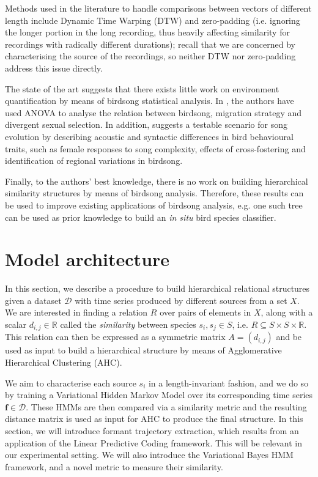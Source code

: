 \documentclass[pdftex,11pt,a4paper]{article}
\theoremstyle{definition}
\theoremstyle{remark}
\newcommand*{\V}[1]{\mathbf{#1}}%
\begin{document}
\par Methods used in the literature to handle comparisons between vectors of different length include Dynamic Time Warping (DTW) \cite{Jancovic2013,Muda2010} and zero-padding (i.e. ignoring the longer portion in the long recording, thus heavily affecting similarity for recordings with radically different durations); recall that we are concerned by characterising the source of the recordings, so neither DTW nor zero-padding address this issue directly. 
\par The state of the art suggests that there exists little work on environment quantification by means of birdsong statistical analysis. In \cite{Collins2009}, the authors have used ANOVA to analyse the relation between birdsong, migration strategy and divergent sexual selection. In addition, \cite{BolhuisJohanJ.andEveraertMartin2015} suggests a testable scenario for song evolution by describing acoustic and syntactic differences in bird behavioural traits, such as female responses to song complexity, effects of cross-fostering and identification of regional variations in birdsong.
\par Finally, to the authors' best knowledge, there is no work on building hierarchical similarity structures by means of birdsong analysis. Therefore, these results can be used to improve existing applications of birdsong analysis, e.g. one such tree can be used as prior knowledge to build an \emph{in situ} bird species classifier.

\section{Model architecture}
\label{section_model}
In this section, we describe a procedure to build hierarchical relational structures given a dataset $\mathcal{D}$ with time series produced by different sources from a set $X$. We are interested in finding a relation $R$ over pairs of elements in $X$, along with a scalar $d_{i, j} \in \mathbb{R}$ called the \emph{similarity} between species $s_i, s_j \in S$, i.e. $R \subseteq S \times S \times \mathbb{R}$. This relation can then be expressed as a symmetric matrix $A = (d_{i,j})$ and be used as input to build a hierarchical structure by means of Agglomerative Hierarchical Clustering (AHC). 
\par We aim to characterise each source $s_i$ in a length-invariant fashion, and we do so by training a Variational Hidden Markov Model over its corresponding time series $\V{f} \in \mathcal{D}$. These HMMs are then compared via a similarity metric and the resulting distance matrix is used as input for AHC to produce the final structure. In this section, we will introduce formant trajectory extraction, which results from an application of the Linear Predictive Coding framework. This will be relevant in our experimental setting. We will also introduce the Variational Bayes HMM framework, and a novel metric to measure their similarity.
\end{document}
